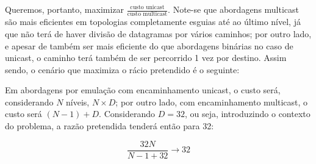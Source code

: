 \begin{enumerate}[leftmargin=\labelsep]
        Queremos, portanto, maximizar $\frac{\text{custo unicast}}{\text{custo multicast}}$.
        Note-se que abordagens multicast são mais eficientes em topologias
        completamente esguias até ao último nível, já que não terá de haver divisão
        de datagramas por vários caminhos; por outro lado, e apesar de
        também ser mais eficiente do que abordagens binárias no caso de unicast,
        o caminho terá também de ser percorrido 1 vez por destino. Assim sendo, o
        cenário que maximiza o rácio pretendido é o seguinte:

        \begin{figure}[h]
          \centering
          
        \end{figure}

        Em abordagens por emulação com encaminhamento unicast, o custo será, considerando
        $N$ níveis, $N \times D$; por outro lado, com encaminhamento multicast,
        o custo será $(N - 1) + D$. Considerando $D = 32$, ou seja, introduzindo
        o contexto do problema, a razão pretendida tenderá então para 32:

        $$
          \frac{32N}{N - 1 + 32} \to 32
        $$

\end{enumerate}